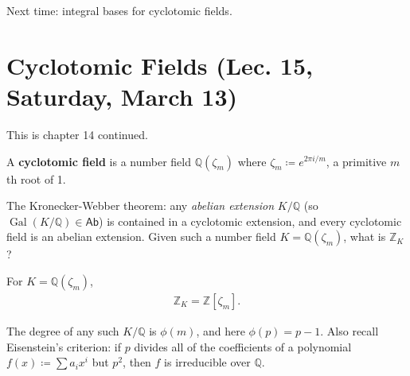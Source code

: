 \begin{remark}

Next time: integral bases for cyclotomic fields.

\end{remark}

\hypertarget{cyclotomic-fields-lec.-15-saturday-march-13}{%
\section{Cyclotomic Fields (Lec. 15, Saturday, March
13)}\label{cyclotomic-fields-lec.-15-saturday-march-13}}

\begin{remark}

This is chapter 14 continued.

\end{remark}

\begin{definition}

A \textbf{cyclotomic field} is a number field \({\mathbb{Q}}( \zeta_m)\)
where \(\zeta_m \coloneqq e^{2\pi i / m}\), a primitive \(m\)th root of
1.

\end{definition}

\begin{remark}

The Kronecker-Webber theorem: any \emph{abelian extension}
\(K/{\mathbb{Q}}\) (so
\(\operatorname{Gal}(K/{\mathbb{Q}}) \in {\mathsf{Ab}}\)) is contained
in a cyclotomic extension, and every cyclotomic field is an abelian
extension. Given such a number field \(K = {\mathbb{Q}}( \zeta_m)\),
what is \({\mathbb{Z}}_K\)?

\end{remark}

\begin{theorem}

For \(K = {\mathbb{Q}}( \zeta_m)\),
\begin{align*}
{\mathbb{Z}}_K = {\mathbb{Z}}[ \zeta_m ]
.\end{align*}

\end{theorem}

\begin{remark}

The degree of any such \(K/{\mathbb{Q}}\) is \(\phi(m)\), and here
\(\phi(p) = p-1\). Also recall Eisenstein's criterion: if \(p\) divides
all of the coefficients of a polynomial \(f(x) \coloneqq\sum a_i x^i\)
but
\(p^2%
\), then \(f\) is irreducible over \({\mathbb{Q}}\).

\end{remark}


